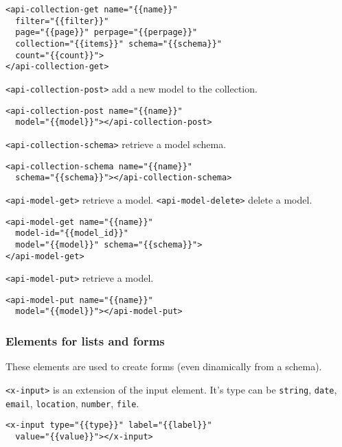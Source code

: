 \begin{lstlisting}[language=HTML5]
<api-collection-get name="{{name}}" 
  filter="{{filter}}" 
  page="{{page}}" perpage="{{perpage}}"  
  collection="{{items}}" schema="{{schema}}"
  count="{{count}}">
</api-collection-get>
\end{lstlisting}

\texttt{<api-collection-post>} add a new model to the collection. 

\begin{lstlisting}[language=HTML5]
<api-collection-post name="{{name}}" 
  model="{{model}}"></api-collection-post>
\end{lstlisting}

\texttt{<api-collection-schema>} retrieve a model schema.

\begin{lstlisting}[language=HTML5]
<api-collection-schema name="{{name}}" 
  schema="{{schema}}"></api-collection-schema>
\end{lstlisting}

\texttt{<api-model-get>} retrieve a model. 
\texttt{<api-model-delete>} delete a model. 

\begin{lstlisting}[language=HTML5]
<api-model-get name="{{name}}" 
  model-id="{{model_id}}"
  model="{{model}}" schema="{{schema}}">
</api-model-get>
\end{lstlisting}

\texttt{<api-model-put>} retrieve a model. 

\begin{lstlisting}[language=HTML5]
<api-model-put name="{{name}}" 
  model="{{model}}"></api-model-put>
\end{lstlisting}


\subsubsection{Elements for lists and forms}
These elements are used to create forms (even dinamically from a schema). 

\texttt{<x-input>} is an extension of the input element. 
It's type can be \texttt{string}, \texttt{date}, \texttt{email}, \texttt{location},
\texttt{number}, \texttt{file}.

\begin{lstlisting}[language=HTML5]
<x-input type="{{type}}" label="{{label}}"
  value="{{value}}"></x-input>
\end{lstlisting}

